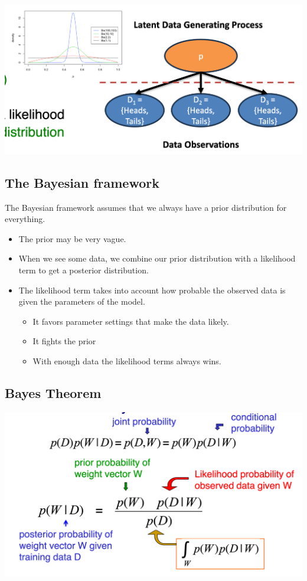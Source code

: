 \documentclass[11pt]{article}
\theoremstyle{definition}
\begin{document}
\includegraphics[width=\textwidth]{9.png}

\subsection{The Bayesian framework}

The Bayesian framework assumes that we always have a prior
distribution for everything.

\begin{itemize}
    \item The prior may be very vague.
    \item When we see some data, we combine our prior distribution
    with a likelihood term to get a posterior distribution.
    \item The likelihood term takes into account how probable the
    observed data is given the parameters of the model.
    \begin{itemize}
        \item It favors parameter settings that make the data likely.
        \item It fights the prior
        \item With enough data the likelihood terms always wins.
    \end{itemize}
\end{itemize}

\subsection{Bayes Theorem}
\includegraphics[width=\textwidth]{10.png}
\end{document}
